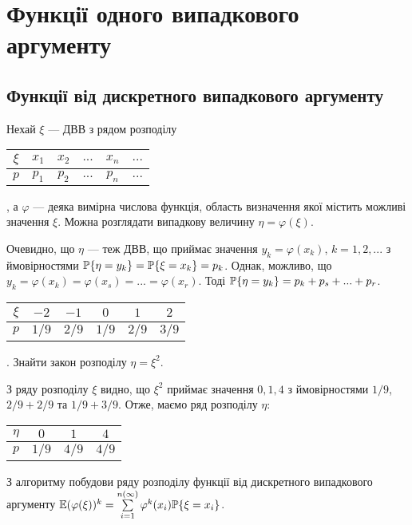 
\section{Функції одного випадкового аргументу}
\subsection{Функції від дискретного випадкового аргументу}
Нехай $\xi$ --- ДВВ з рядом розподілу 
\begin{tabular}{|c|c|c|c|c|c|}
    \hline
    $\xi$ & $x_1$ & $x_2$ & $...$ & $x_n$ & $...$ \\
    \hline
    $p$ & $p_1$ & $p_2$ & $...$ & $p_n$ & $...$ \\
    \hline
\end{tabular}, а $\varphi$ --- деяка вимірна числова функція, 
область визначення якої містить можливі значення $\xi$.
Можна розглядати випадкову величину $\eta = \varphi(\xi)$.

Очевидно, що $\eta$ --- теж ДВВ, що приймає значення $y_k = \varphi(x_k)$, 
$k = 1, 2, ...$ з ймовірностями $\P\{\eta = y_k\} = \P\{\xi = x_k\} = p_k$.
Однак, можливо, що $y_k = \varphi(x_k) = \varphi(x_s) = ... = \varphi(x_r)$.
Тоді $\P\{\eta = y_k\} = p_k + p_s + ... + p_r$.

\begin{example}
    \begin{tabular}{|c|c|c|c|c|c|}
        \hline
        $\xi$ & $-2$ & $-1$ & $0$ & $1$ & $2$ \\
        \hline
        $p$ & $1/9$ & $2/9$ & $1/9$ & $2/9$ & $3/9$ \\
        \hline
    \end{tabular}. Знайти закон розподілу $\eta = \xi^2$.
    
    З ряду розподілу $\xi$ видно, що $\xi^2$ приймає значення $0, 1, 4$ з
    ймовірностями $1/9$, $2/9 + 2/9$ та $1/9 + 3/9$.
    Отже, маємо ряд розподілу $\eta$: \begin{tabular}{|c|c|c|c|}
        \hline
        $\eta$ & $0$ & $1$ & $4$ \\
        \hline
        $p$ & $1/9$ & $4/9$ & $4/9$ \\
        \hline
    \end{tabular}
\end{example}

З алгоритму побудови ряду розподілу функції від дискретного
випадкового аргументу $\E(\varphi(\xi))^k = \sum\limits_{i=1}^{n(\infty)} \varphi^k(x_i) \P\{\xi = x_i\}$.

